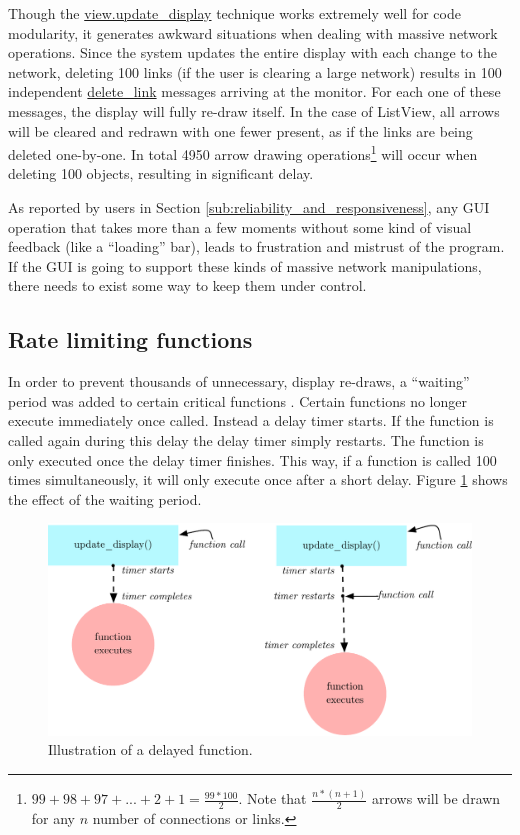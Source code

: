 Though the \url{view.update_display} technique works extremely well for code modularity, it generates awkward situations when dealing with massive network operations. Since the system updates the entire display with each change to the network, deleting 100 links (if the user is clearing a large network) results in 100 independent \url{delete_link} messages arriving at the monitor. For each one of these messages, the display will fully re-draw itself. In the case of ListView, all arrows will be cleared and redrawn with one fewer present, as if the links are being deleted one-by-one. In total 4950 arrow drawing operations\footnote{$99 + 98 + 97 + ... + 2 + 1 = \frac{99*100}{2}$. Note that $\frac{n*(n+1)}{2}$ arrows will be drawn for any $n$ number of connections or links.} will occur when deleting 100 objects, resulting in significant delay. 

As reported by users in Section \ref{sub:reliability_and_responsiveness}, any GUI operation that takes more than a few moments without some kind of visual feedback (like a ``loading'' bar), leads to frustration and mistrust of the program. If the GUI is going to support these kinds of massive network manipulations, there needs to exist some way to keep them under control.

	\subsection{Rate limiting functions} %
	\label{sub:rate_limiting_certain_functions}

In order to prevent thousands of unnecessary, display re-draws, a ``waiting'' period was added to certain critical functions . Certain functions no longer execute immediately once called. Instead a delay timer starts. If the function is called again during this delay the delay timer simply restarts. The function is only executed once the delay timer finishes. This way, if a function is called 100 times simultaneously, it will only execute once after a short delay. Figure \ref{fig:waiting_period} shows the effect of the waiting period.

\begin{figure}
	\centering
		\includegraphics[width=1\textwidth]{figures/waiting_period}
		\caption{Illustration of a delayed function.}
		\label{fig:waiting_period}
\end{figure}

